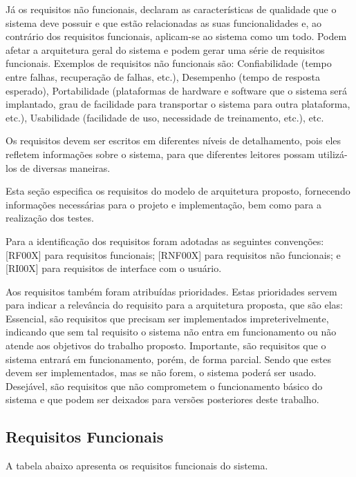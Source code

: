 Já os requisitos não funcionais, declaram as características de qualidade que o sistema deve possuir e que estão relacionadas as suas funcionalidades e, ao contrário dos requisitos funcionais, aplicam-se ao sistema como um todo. Podem afetar a arquitetura geral do sistema e podem gerar uma série de requisitos funcionais. Exemplos de requisitos não funcionais são: Confiabilidade (tempo entre falhas, recuperação de falhas, etc.), Desempenho (tempo de resposta esperado), Portabilidade (plataformas de hardware e software que o sistema será implantado, grau de facilidade para transportar o sistema para outra plataforma, etc.), Usabilidade (facilidade de uso, necessidade de treinamento, etc.), etc.

Os requisitos devem ser escritos em diferentes níveis de detalhamento, pois eles refletem informações sobre o sistema, para que diferentes leitores possam utilizá-los de diversas maneiras.

Esta seção especifica os requisitos do modelo de arquitetura proposto, fornecendo informações necessárias para o projeto e implementação, bem como para a realização dos testes.

Para a identificação dos requisitos foram adotadas as seguintes convenções: [RF00X] para requisitos funcionais; [RNF00X] para requisitos não funcionais; e [RI00X]  para requisitos de interface com o usuário.

Aos requisitos também foram atribuídas prioridades. Estas prioridades servem para indicar a relevância do requisito para a arquitetura proposta, que são elas: Essencial, são requisitos que precisam ser implementados impreterivelmente, indicando que sem tal requisito o sistema não entra em funcionamento ou não atende aos objetivos do trabalho proposto. Importante, são requisitos que o sistema entrará em funcionamento, porém, de forma parcial. Sendo que estes  devem ser implementados, mas se não forem, o sistema poderá ser usado. Desejável, são requisitos que não comprometem o funcionamento básico do sistema e que podem ser deixados para versões posteriores deste trabalho.

\subsection{Requisitos Funcionais}

A tabela abaixo apresenta os requisitos funcionais do sistema.


